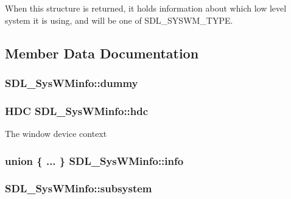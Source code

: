 When this structure is returned, it holds information about which low level system it is using, and will be one of S\+D\+L\+\_\+\+S\+Y\+S\+W\+M\+\_\+\+T\+Y\+PE. 

\subsection{Member Data Documentation}
\subsubsection[{\texorpdfstring{dummy}{dummy}}]{ S\+D\+L\+\_\+\+Sys\+W\+Minfo\+::dummy}\hypertarget{struct_s_d_l___sys_w_minfo_a1edbb8fc4fc59081efe6070f9167c1cf}{}\label{struct_s_d_l___sys_w_minfo_a1edbb8fc4fc59081efe6070f9167c1cf}
\subsubsection[{\texorpdfstring{hdc}{hdc}}]{\setlength{\rightskip}{0pt plus 5cm}H\+DC S\+D\+L\+\_\+\+Sys\+W\+Minfo\+::hdc}\hypertarget{struct_s_d_l___sys_w_minfo_a5c9d0745b083422834681e99c38b803e}{}\label{struct_s_d_l___sys_w_minfo_a5c9d0745b083422834681e99c38b803e}
The window device context 
\subsubsection[{\texorpdfstring{info}{info}}]{\setlength{\rightskip}{0pt plus 5cm}union \{ ... \}   S\+D\+L\+\_\+\+Sys\+W\+Minfo\+::info}\hypertarget{struct_s_d_l___sys_w_minfo_a96639a5304141225509483baf5910439}{}\label{struct_s_d_l___sys_w_minfo_a96639a5304141225509483baf5910439}
\subsubsection[{\texorpdfstring{subsystem}{subsystem}}]{ S\+D\+L\+\_\+\+Sys\+W\+Minfo\+::subsystem}\hypertarget{struct_s_d_l___sys_w_minfo_a438b6a06ab3ee417293c7b7fc5a23855}{}\label{struct_s_d_l___sys_w_minfo_a438b6a06ab3ee417293c7b7fc5a23855}

